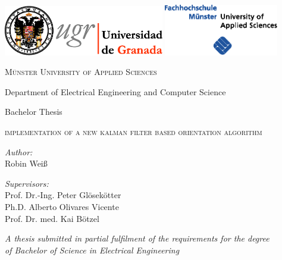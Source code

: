 \begin{titlepage}
\label{ch:titlepage}

\begin{center}

\includegraphics[width=7cm]{images/universidad_de_granada.eps}
	\hfill
\includegraphics[width=5cm]{images/fh-muenster.eps} 

\vspace{2.5cm}

{\large \textsc{Münster University of Applied Sciences}}

Department of Electrical Engineering and Computer Science

\vspace{1.5cm}

{\large Bachelor Thesis}

\vspace{0.8cm}

\begin{LARGE}
\textsc{implementation of a new kalman filter based orientation algorithm}
\end{LARGE}

\vspace{1.8cm}

\begin{minipage}{0.4\textwidth}
\begin{flushleft}
\emph{Author:} \\
Robin Weiß
\end{flushleft}
\end{minipage}
\hfill
\begin{minipage}{0.5\textwidth}
\begin{flushright}
\emph{Supervisors:} \\
Prof. Dr.-Ing. Peter Glösekötter \\
Ph.D. Alberto Olivares Vicente \\
Prof. Dr. med. Kai Bötzel
\end{flushright}
\end{minipage}

\vspace{2.0cm}
	
\textit{A thesis submitted in partial fulfilment of the requirements for the degree\\
of Bachelor of Science in Electrical Engineering}

\vfill

\monthname \: \the\year 

\end{center}

\end{titlepage}

